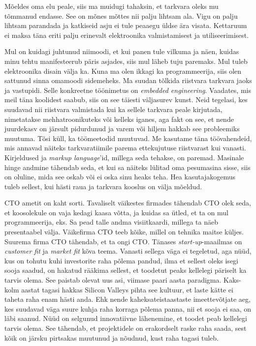 Mõeldes oma elu peale, siis ma muidugi tahaksin, et tarkvara oleks mu tõmmanud 
endasse. See on mõnes mõttes nii palju lihtsam ala. \mbox{Vigu} on palju 
lihtsam parandada ja katkiseid asju ei tule peaaegu üldse ära visata. 
Kettaruum ei maksa täna eriti palju erinevalt elektroonika valmistamisest ja
utiliseerimisest.

Mul on kuidagi juhtunud niimoodi, et kui panen 
tule vilkuma ja näen, kuidas minu tehtu manifesteerub päris asjades, 
siis mul läheb tuju paremaks. Mul tuleb elektroonika disain välja ka. Kuna ma 
olen ikkagi ka
programmeerija, siis olen sattunud sinna omamoodi side{\-}meheks. Ma suudan tõlkida 
riistvara tarkvara jaoks ja vastupidi. Selle konkreetne töönimetus on 
\emph{embedded engineering}. Vaadates, mis meil täna koolidest 
saabub, siis on see täiesti väljasurev kunst. Neid tegelasi, kes suudavad nii 
riistvara valmistada kui ka sellele tarkvara peale kirjutada, 
nimetatakse mehhatroonikuteks või kelleks iganes, aga fakt on see, et nende 
juurdekasv on järsult pidurdunud ja varem või hiljem hakkab see 
probleemiks muutuma. Tõsi küll, ka töömeetodid muutuvad. Me kasutame täna
töövahendeid, mis annavad näiteks tarkvaratiimile parema 
ettekujutuse riistvarast kui vanasti. Kirjeldused ja 
\emph{markup language}'id, millega seda tehakse, on paremad. Masinale hinge 
andmine tähendab seda, et kui sa näiteks lülitad oma pesumasina sisse, siis on 
oluline, mida see oskab või ei oska sinu 
heaks teha. Hea kasutajakogemus tuleb sellest, kui hästi raua ja tarkvara 
kooslus 
on välja mõeldud. 


CTO ametit on kaht sorti. Tavaliselt väikestes firmades tähendab 
CTO olek seda, et koosolekule on vaja kedagi kaasa võtta, ja kuidas sa 
ütled, et ta on mul programmeerija, eks. Sa pead talle andma 
visiitkaardi, millega ta näeb presentaabel välja. Väikefirma CTO 
teeb kõike, millel on tehnika maitse 
küljes. Suurema firma CTO tähendab, et ta ongi CTO. Tänases 
\emph{start-up}-maailmas on \emph{customer fit} ja \emph{market fit} kõva 
teema. 
Vanasti sellega väga ei tegeletud, aga nüüd, kus on tohutu kuhi 
investorite raha põlema pandud, ilma et sellest oleks isegi sooja saadud, on 
hakatud rääkima sellest, et toodetut peaks kellelegi päriselt ka
tarvis olema. See paistab olevat uus asi, viimase paari aasta 
paradigma. Kaks-kolm aastat tagasi hakkas Silicon Valleys 
pihta see kultuur, et laste kätte ei taheta raha enam hästi anda. Ehk 
nende kaheksateistaastaste imeettevõtjate aeg, kes suudavad väga suure kuhja 
raha 
korraga põlema panna, nii et sooja ei saa, on läbi saanud. Nüüd on selgunud 
innovatiivne lähenemine, et toodet peab 
kellelegi tarvis olema. See tähendab, et projektidele on erakordselt raske raha 
saada, sest kõik 
on järsku pirtsakas muutunud ja nõudnud, kust raha tagasi tuleb. 

